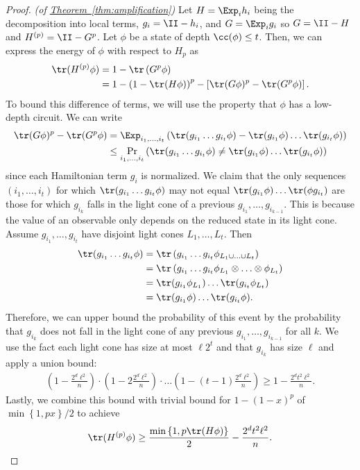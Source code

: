 \documentclass[11pt]{article}
\newcommand{\expref}[2]{\texorpdfstring{\hyperref[#2]{#1~\ref{#2}}}{#1~\ref{#2}}}
\begin{document}
\begin{proof}\textit{(of \expref{Theorem}{thm:amplification})}
Let $H = \Exp_i h_i$ being the decomposition into local terms, $g_i = \II - h_i$, and $G = \Exp_i g_i$ so $G = \II - H$ and $H^{(p)} = \II - G^p$.
Let $\phi$ be a state of depth $\cc(\phi) \leq t$. Then, we can express the energy of $\phi$ with respect to $H_p$ as
\begin{align}
    \tr(H^{(p)} \phi) &= 1 - \tr \left( G^p \phi \right) \\
    &= 1 - \left( 1 - \tr(H \phi) \right)^p - \left[ \tr(G \phi)^p - \tr(G^p \phi) \right].
\end{align}
To bound this difference of terms, we will use the property that $\phi$ has a low-depth circuit.
%
We can write
\begin{align}
    \tr(G \phi)^p - \tr(G^p \phi) &= \Exp_{i_1, \ldots, i_t} \left( \tr(g_{i_1} \ldots g_{i_t} \phi) - \tr(g_{i_1} \phi) \ldots \tr( g_{i_t} \phi) \right) \\
    &\leq \Pr_{i_1, \ldots, i_t} \left( \tr(g_{i_1} \ldots g_{i_t} \phi) \neq \tr(g_{i_1} \phi) \ldots \tr( g_{i_t} \phi) \right)
\end{align}
since each Hamiltonian term $g_i$ is normalized. We claim that the only sequences $(i_1, \ldots, i_t)$ for which $\tr(g_{i_1} \ldots g_{i_t} \phi)$ may not equal $\tr(g_{i_1} \phi) \ldots \tr(\phi g_{i_t})$ are those for which $g_{i_k}$ falls in the light cone of a previous $g_{i_1}, \ldots, g_{i_{k-1}}$. This is because the value of an observable only depends on the reduced state in its light cone. Assume $g_{i_1}, \ldots, g_{i_t}$ have disjoint light cones $L_1, \ldots, L_t$. Then
\begin{align}
\tr(g_{i_1} \ldots g_{i_t} \phi) &= \tr \left( g_{i_1} \ldots g_{i_t} \phi_{L_1 \cup \ldots \cup L_t} \right) \\
&= \tr \left( g_{i_1} \ldots g_{i_t} \phi_{L_1} \otimes \ldots \otimes \phi_{L_t} \right) \\
&= \tr(g_{i_1} \phi_{L_1}) \ldots \tr(g_{i_t} \phi_{L_t}) \\
&= \tr(g_{i_1} \phi) \ldots \tr(g_{i_t} \phi).
\end{align}
Therefore, we can upper bound the probability of this event by the probability that $g_{i_k}$ does not fall in the light cone of any previous $g_{i_1}, \ldots, g_{i_{k-1}}$ for all $k$. We use the fact each light cone has size at most $\ell 2^t$ and that $g_{i_k}$ has size $\ell$ and apply a union bound:
\begin{align}
    \left( 1 - \frac{2^d \ell^2}{n} \right) \cdot \left( 1 - 2 \frac{2^d \ell^2}{n} \right) \cdot \ldots \left( 1 - (t-1) \frac{2^d \ell^2}{n} \right) \geq 1 - \frac{2^d t^2 \ell^2}{n}.
\end{align}
Lastly, we combine this bound with trivial bound for $1 - \left( 1 - x \right)^p $ of $\min \left\{1, p x\right\} / 2$ to achieve
\begin{align}
\tr(H^{(p)} \phi) \geq \frac{\min\left\{1, p \tr(H \phi)\right\}}{2} - \frac{2^d t^2 \ell^2}{n}.
\end{align}
\end{proof}
\end{document}
